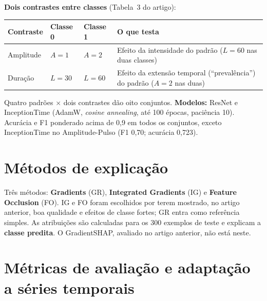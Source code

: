 \documentclass[11pt,a4paper]{article}
\begin{document}
\textbf{Dois contrastes entre classes} (Tabela~3 do artigo):
\begin{center}\small
\begin{tabularx}{\linewidth}{lllX}
\toprule
\textbf{Contraste} & \textbf{Classe 0} & \textbf{Classe 1} & \textbf{O que testa} \\
\midrule
Amplitude & $A = 1$ & $A = 2$ & Efeito da intensidade do padrão ($L = 60$ nas duas classes) \\
Duração   & $L = 30$ & $L = 60$ & Efeito da extensão temporal (“prevalência”) do padrão ($A = 2$ nas duas) \\
\bottomrule
\end{tabularx}
\end{center}
Quatro padrões $\times$ dois contrastes dão oito conjuntos. \textbf{Modelos:} ResNet e InceptionTime (AdamW, \textit{cosine annealing}, até 100 épocas, paciência 10). Acurácia e F1 ponderado acima de 0,9 em todos os conjuntos, exceto InceptionTime no Amplitude-Pulso (F1 0,70; acurácia 0,723).

\section{Métodos de explicação}
Três métodos: \textbf{Gradients} (GR), \textbf{Integrated Gradients} (IG) e \textbf{Feature Occlusion} (FO). IG e FO foram escolhidos por terem mostrado, no artigo anterior, boa qualidade e efeitos de classe fortes; GR entra como referência simples. As atribuições são calculadas para os 300 exemplos de teste e explicam a \textbf{classe predita}. O GradientSHAP, avaliado no artigo anterior, não está neste.

\section{Métricas de avaliação e adaptação a séries temporais}
\end{document}
